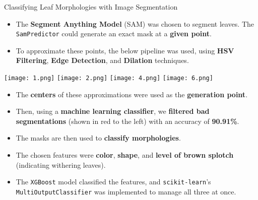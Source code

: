 \documentclass[final]{beamer}
\newlength{\colwidth}
\begin{document}
\begin{frame}[t]
\begin{columns}[t]
\begin{column}{\colwidth}
\begin{block}{Classifying Leaf Morphologies with Image Segmentation}
\begin{itemize}
    \item The \textbf{Segment Anything Model} (SAM) was chosen to segment leaves. The \texttt{SamPredictor} could generate an exact mask at a \textbf{given point}.
    \item To approximate these points, the below pipeline was used, using \textbf{HSV Filtering}, \textbf{Edge Detection}, and \textbf{Dilation} techniques.
\end{itemize}


\vspace{-1em}

\begin{center}
    \texttt{[image: 1.png]}
    \texttt{[image: 2.png]}
    \texttt{[image: 4.png]}
    \texttt{[image: 6.png]}
\end{center}

\vspace{-0.5\intextsep}


\vspace{-0.7em}

\begin{itemize}
    \parpic(0px, 0px)(0px, 2.75cm)[l]{
        \begin{minipage}{0.28\colwidth}
            \texttt{[image: images/2\_better.png]}
        \end{minipage}
    }
    \item The \textbf{centers} of these approximations were used as the \textbf{generation point}.
    \item Then, using a \textbf{machine learning classifier}, we \textbf{filtered bad segmentations} (shown in red to the left) with an accuracy of \textbf{90.91\%}.
    \item The masks are then used to \textbf{classify morphologies}.
    \item The chosen features were \textbf{color}, \textbf{shape}, and \textbf{level of brown splotch} (indicating withering leaves).
    \item The \texttt{XGBoost} model classified the features, and \texttt{scikit-learn}'s \texttt{MultiOutputClassifier} was implemented to manage all three at once.
\end{itemize}


\end{block}
\end{column}
\end{columns}
\end{frame}
\end{document}
